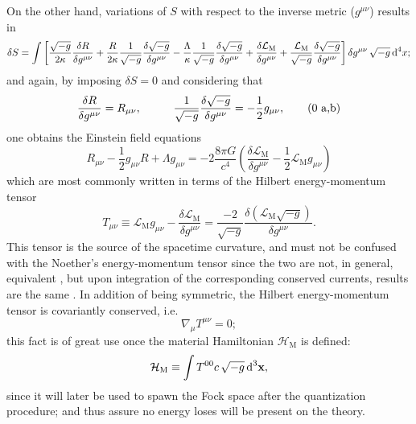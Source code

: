 On the other hand, variations of $S$ with respect to the inverse metric ($g^{\mu\nu}$) results in
\begin{multline}
	\delta S=\int \left[\frac{\sqrt{-g}}{2\kappa}\frac{\delta R}{\delta g^{\mu\nu}}+\frac{R}{2\kappa}\frac{1}{\sqrt{-g}}\frac{\delta \sqrt{-g}}{\delta g^{\mu\nu}}-\frac{\Lambda}{\kappa}\frac{1}{\sqrt{-g}}\frac{\delta\sqrt{-g}}{\delta g^{\mu\nu}}+\frac{\delta\mathcal{L}_{\text{M}}}{\delta g^{\mu\nu}}+\frac{\mathcal{L}_{\text{M}}}{\sqrt{-g}}\frac{\delta\sqrt{-g}}{\delta g^{\mu\nu}}\right]\delta g^{\mu\nu}\,\sqrt{-g}\,\text{d}^4x;
\end{multline}
and again, by imposing $\delta S=0$ and considering that
\begin{subequations}
	\begin{gather}
		\frac{\delta R}{\delta g^{\mu\nu}}=R_{\mu\nu},\hspace{1.0cm}\frac{1}{\sqrt{-g}}\frac{\delta\sqrt{-g}}{\delta g^{\mu\nu}}=-\frac{1}{2}g_{\mu\nu},\tag{\theequation \,\,a,b}
	\end{gather}
\end{subequations}
one obtains the Einstein field equations
\begin{equation}\label{eq: Einstein Field Equations}
	R_{\mu\nu}-\frac{1}{2}g_{\mu\nu}R+\Lambda g_{\mu\nu}=-2\frac{8\pi G}{c^4}\left(\frac{\delta\mathcal{L}_{\text{M}}}{\delta g^{\mu\nu}}-\frac{1}{2}\mathcal{L}_{\text{M}}g_{\mu\nu}\right)
\end{equation}
which are most commonly written in terms of the Hilbert energy-momentum tensor
\begin{equation}\label{eq: Hilbert energy-momentum tensor}
	T_{\mu\nu}\equiv \mathcal{L}_{\text{M}}g_{\mu\nu}-\frac{\delta\mathcal{L}_{\text{M}}}{\delta g^{\mu\nu}}=\frac{-2}{\sqrt{-g}}\frac{\delta \left(\mathcal{L}_{\text{M}}\sqrt{-g}\right)}{\delta g^{\mu\nu}}.
\end{equation}
This tensor is the source of the spacetime curvature, and must not be confused with the Noether's energy-momentum tensor since the two are not, in general, equivalent \cite{Energy-MomentumTensor}, but upon integration of the corresponding conserved currents, results are the same \cite{NoetherVsHilbert}. In addition of being symmetric, the Hilbert energy-momentum tensor is covariantly conserved, i.e.
\begin{equation}
	\nabla_\mu T^{\mu\nu}=0;
\end{equation}
this fact is of great use once the material Hamiltonian $\mathcal{H}_{\text{M}}$ is defined:
\begin{equation}\label{eq: General Hamiltonian}
	\mathcal{H}_{\text{M}}\equiv \int T^{00}c\,\sqrt{-g}\,\text{d}^3\mathbf{x},
\end{equation}
since it will later be used to spawn the Fock space after the quantization procedure; and thus assure no energy loses will be present on the theory.
